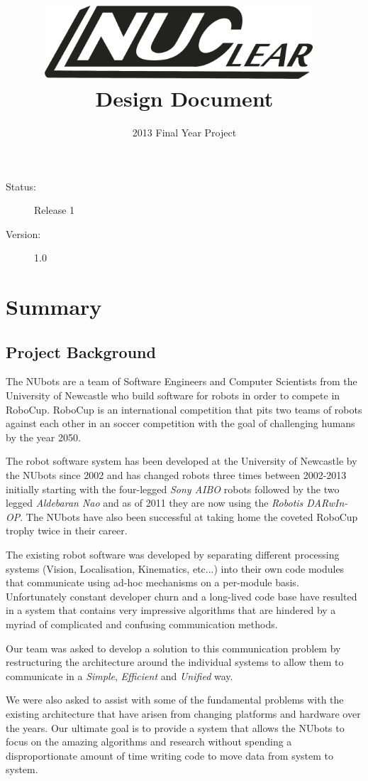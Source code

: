 \documentclass[english,12pt]{scrartcl}
\title{\includegraphics[width=0.75\textwidth]{./Logo/NUClear-logo}~\\[1cm] Design Document}
\author{2013 Final Year Project}
\begin{document}
	\maketitle

	\vfill
	{\large
		\begin{description}
			\item [Status:] Release 1
			\item [Version:] 1.0
		\end{description}}

	\clearpage
	\tableofcontents
	\clearpage

	\section{Summary}
		\subsection{Project Background}
			The NUbots are a team of Software Engineers and Computer Scientists from the University of Newcastle who build software for robots in order to compete in RoboCup.
			RoboCup is an international competition that pits two teams of robots against each other in an soccer competition with the goal of challenging humans by the year 2050.

			The robot software system has been developed at the University of Newcastle by the NUbots since 2002 and has changed robots three times between 2002-2013 initially starting with the four-legged \emph{Sony AIBO} robots followed by the two legged \emph{Aldebaran Nao} and as of 2011 they are now using the \emph{Robotis DARwIn-OP}.
			The NUbots have also been successful at taking home the coveted RoboCup trophy twice in their career.

			The existing robot software was developed by separating different processing systems (Vision, Localisation, Kinematics, etc...) into their own code modules that communicate using ad-hoc mechanisms on a per-module basis.
			Unfortunately constant developer churn and a long-lived code base have resulted in a system that contains very impressive algorithms that are hindered by a myriad of complicated and confusing communication methods.

			Our team was asked to develop a solution to this communication problem by restructuring the architecture around the individual systems to allow them to communicate in a \emph{Simple}, \emph{Efficient} and \emph{Unified} way.

			We were also asked to assist with some of the fundamental problems with the existing architecture that have arisen from changing platforms and hardware over the years.
			Our ultimate goal is to provide a system that allows the NUbots to focus on the amazing algorithms and research without spending a disproportionate amount of time writing code to move data from system to system.
\end{document}
